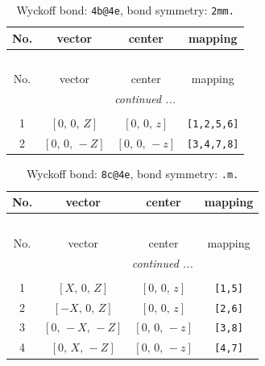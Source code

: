\documentclass[fleqn,8pt]{jsarticle}
\begin{document}
\renewcommand{\arraystretch}{1.2}
\begin{longtable}{cccc}
\caption{Wyckoff bond: {\tt 4b@4e}, bond symmetry: {\tt 2mm.}}
 \\
 \hline \hline
No. & vector & center & mapping \\ \hline \endfirsthead

\multicolumn{3}{l}{\tablename\ \thetable{}} \\
 \hline \hline
No. & vector & center & mapping \\ \hline \endhead

 \hline \hline
\multicolumn{3}{r}{\footnotesize\it continued ...} \\ \endfoot

 \hline \hline
\multicolumn{3}{r}{} \\ \endlastfoot

1 & $\left[ 0,\, 0,\, Z \right]$ & $\left[ 0,\, 0,\, z \right]$ & {\tt [1,2,5,6]} \\ \hline
2 & $\left[ 0,\, 0,\, - Z \right]$ & $\left[ 0,\, 0,\, - z \right]$ & {\tt [3,4,7,8]} \\
\end{longtable}
\renewcommand{\arraystretch}{1.2}
\begin{longtable}{cccc}
\caption{Wyckoff bond: {\tt 8c@4e}, bond symmetry: {\tt .m.}}
 \\
 \hline \hline
No. & vector & center & mapping \\ \hline \endfirsthead

\multicolumn{3}{l}{\tablename\ \thetable{}} \\
 \hline \hline
No. & vector & center & mapping \\ \hline \endhead

 \hline \hline
\multicolumn{3}{r}{\footnotesize\it continued ...} \\ \endfoot

 \hline \hline
\multicolumn{3}{r}{} \\ \endlastfoot

1 & $\left[ X,\, 0,\, Z \right]$ & $\left[ 0,\, 0,\, z \right]$ & {\tt [1,5]} \\ \hline
2 & $\left[ - X,\, 0,\, Z \right]$ & $\left[ 0,\, 0,\, z \right]$ & {\tt [2,6]} \\ \hline
3 & $\left[ 0,\, - X,\, - Z \right]$ & $\left[ 0,\, 0,\, - z \right]$ & {\tt [3,8]} \\ \hline
4 & $\left[ 0,\, X,\, - Z \right]$ & $\left[ 0,\, 0,\, - z \right]$ & {\tt [4,7]} \\
\end{longtable}
\end{document}
